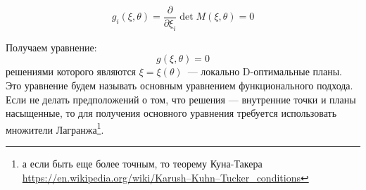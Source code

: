\begin{equation}
g_i(\xi, \theta) = \frac{\partial{}}{\partial{\xi_i}} \det M(\xi, \theta) = 0
\end{equation} 

Получаем уравнение:
\[g(\xi, \theta) = 0\]
решениями которого являются $\xi = \xi(\theta)$ — локально D-оптимальные планы.  Это уравнение будем называть основным уравнением функционального подхода. %
 Если не делать предположений о том, что решения — внутренние точки и планы насыщенные, то для получения основного уравнения требуется использовать множители Лагранжа\footnote{а если быть еще более точным, то теорему Куна-Такера \url{https://en.wikipedia.org/wiki/Karush–Kuhn–Tucker_conditions}}.
